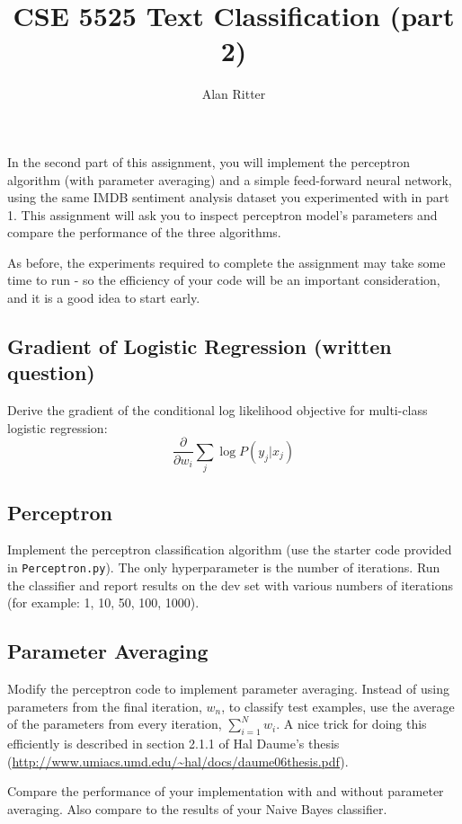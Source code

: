 \documentclass[12pt, letterpaper]{article}
\begin{document}
\title{CSE 5525 Text Classification (part 2)}
\author{Alan Ritter}
\date{}
\maketitle

In the second part of this assignment, you will implement the perceptron algorithm (with parameter averaging) and a simple feed-forward neural network, using the same IMDB sentiment analysis dataset you experimented with in part 1.  This assignment will ask you to inspect perceptron model's parameters and compare the performance of the three algorithms.

As before, the experiments required to complete the assignment may take some time to run - so the efficiency of your code will be an important consideration, and it is a good idea to start early.

\subsection*{Gradient of Logistic Regression (written question)}
Derive the gradient of the conditional log likelihood objective for multi-class logistic regression:
\begin{equation}
\frac{\partial}{\partial w_i} \sum_{j} \log P(y_j|x_j)
\end{equation}

\subsection*{Perceptron}
Implement the perceptron classification algorithm (use the starter code provided in {\tt Perceptron.py}).
The only hyperparameter is the number of iterations.  Run the classifier and report results on the dev set with
various numbers of iterations (for example: 1, 10, 50, 100, 1000).

\subsection*{Parameter Averaging}
Modify the perceptron code to implement parameter averaging.  Instead of using parameters from the final iteration, $w_n$, to classify test examples, 
use the average of the parameters from every iteration, $\sum_{i=1}^N w_i$.  A nice trick for doing this efficiently is described in section 2.1.1 of Hal Daume's thesis
(\url{http://www.umiacs.umd.edu/~hal/docs/daume06thesis.pdf}).

Compare the performance of your implementation with and without parameter averaging.  Also compare to the results of your Naive Bayes classifier.
\end{document}
